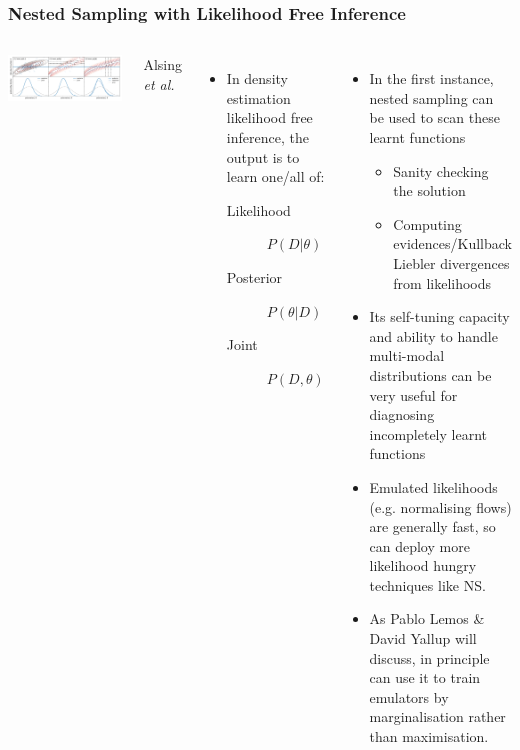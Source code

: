 \documentclass[aspectratio=169]{beamer}
\begin{document}
\begin{frame}
    \frametitle{Nested Sampling with Likelihood Free Inference}
    \begin{columns}
        \includegraphics[width=\textwidth]{figures/three_ways_II.pdf}

        \hfill Alsing \textit{et al.}~
    \begin{itemize}
        \item In density estimation likelihood free inference, the output is to learn one/all of:
            \begin{description}
                \item[Likelihood] $P(D|\theta)$
                \item[Posterior] $P(\theta|D)$ 
                \item[Joint] $P(D,\theta)$
            \end{description}
    \end{itemize}
    \begin{itemize}
        \item In the first instance, nested sampling can be used to scan these learnt functions
            \begin{itemize}
                \item Sanity checking the solution
                \item Computing evidences/Kullback Liebler divergences from likelihoods
            \end{itemize}
        \item Its self-tuning capacity and ability to handle multi-modal distributions can be very useful for diagnosing incompletely learnt functions
        \item Emulated likelihoods (e.g. normalising flows) are generally fast, so can deploy more likelihood hungry techniques like NS.
        \item As Pablo Lemos \& David Yallup will discuss, in principle can use it to train emulators by marginalisation rather than maximisation.
    \end{itemize}
    \end{columns}
\end{frame}
\end{document}
